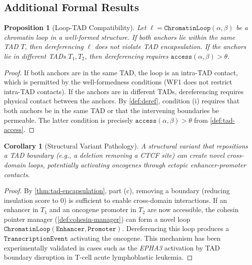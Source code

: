 \documentclass[12pt,a4paper]{article}
\theoremstyle{plain}
\newtheorem{proposition}[theorem]{Proposition}
\newtheorem{corollary}[theorem]{Corollary}
\theoremstyle{definition}
\begin{document}
\subsection{Additional Formal Results}

\begin{proposition}[Loop-TAD Compatibility]\label{prop:loop-tad}
Let $\ell = \texttt{ChromatinLoop}(\alpha, \beta)$ be a chromatin loop in a well-formed structure. If both anchors lie within the same TAD $T$, then dereferencing $\ell$ does not violate TAD encapsulation. If the anchors lie in different TADs $T_1, T_2$, then dereferencing requires $\texttt{access}(\alpha, \beta) > \theta$.
\end{proposition}

\begin{proof}
If both anchors are in the same TAD, the loop is an intra-TAD contact, which is permitted by the well-formedness conditions (WF1 does not restrict intra-TAD contacts). If the anchors are in different TADs, dereferencing requires physical contact between the anchors. By \cref{def:deref}, condition (i) requires that both anchors be in the same TAD or that the intervening boundaries be permeable. The latter condition is precisely $\texttt{access}(\alpha, \beta) > \theta$ from \cref{def:tad-access}.
\end{proof}

\begin{corollary}[Structural Variant Pathology]\label{cor:sv-pathology}
A structural variant that repositions a TAD boundary (e.g., a deletion removing a CTCF site) can create novel cross-domain loops, potentially activating oncogenes through ectopic enhancer-promoter contacts.
\end{corollary}

\begin{proof}
By \cref{thm:tad-encapsulation}, part (c), removing a boundary (reducing insulation score to 0) is sufficient to enable cross-domain interactions. If an enhancer in $T_1$ and an oncogene promoter in $T_2$ are now accessible, the cohesin pointer manager (\cref{def:cohesin-manager}) can form a novel loop $\texttt{ChromatinLoop}(\texttt{Enhancer}, \texttt{Promoter})$. Dereferencing this loop produces a $\texttt{TranscriptionEvent}$ activating the oncogene. This mechanism has been experimentally validated in cases such as the \emph{EPHA3} activation by TAD boundary disruption in T-cell acute lymphoblastic leukemia.
\end{proof}
\end{document}
